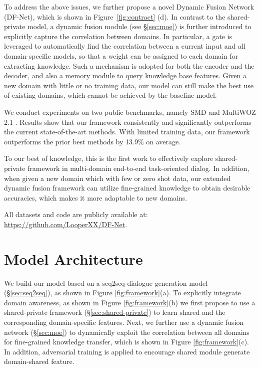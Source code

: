 \documentclass[11pt,a4paper]{article}
\begin{document}
To address the above issues, we further propose a novel Dynamic Fusion Network (DF-Net), which is shown in Figure~\ref{fig:contract} (d). 
In contrast to the shared-private model, a dynamic fusion module (see \S\ref{sec:moe})  is further introduced to explicitly capture the correlation between domains.
In particular, a gate is leveraged to automatically find the correlation between a current input and all domain-specific models, so that a weight can be assigned to each domain for extracting knowledge. Such a mechanism is adopted for both the encoder and the decoder, and also a memory module to query knowledge base features. Given a new domain with little or no training data, our model can still make the best use of existing domains, which cannot be achieved by the baseline model.

We conduct experiments on two public benchmarks, namely SMD \cite{eric-etal-2017-key} and MultiWOZ 2.1 \cite{budzianowski-etal-2018-multiwoz}.
Results show that our framework consistently and significantly outperforms the current state-of-the-art methods.
With limited training data, our framework outperforms the prior best methods by 13.9\% on average. 

To our best of knowledge, this is the first work to  effectively explore shared-private framework in multi-domain end-to-end task-oriented dialog.
In addition, 
when given a new domain which with few or zero shot data, our extended dynamic fusion framework can utilize fine-grained knowledge to obtain desirable accuracies, which makes it more adaptable to new domains.

All datasets and code are publicly available at: \url{https://github.com/LooperXX/DF-Net}.

\section{Model Architecture} \label{basic}
We build our model based on a seq2seq dialogue generation model (\S\ref{sec:seq2seq}), as shown in Figure \ref{fig:framework}(a).
To explicitly integrate domain awareness,
as shown in Figure \ref{fig:framework}(b) we first propose to use a shared-private framework (\S\ref{sec:shared-private}) to learn shared and the corresponding domain-specific features.
Next, we further use a dynamic fusion network (\S\ref{sec:moe}) to dynamically exploit the correlation between all domains for fine-grained knowledge transfer, which is shown in Figure \ref{fig:framework}(c).
In addition, adversarial training is applied to encourage shared module generate domain-shared feature.
\end{document}
